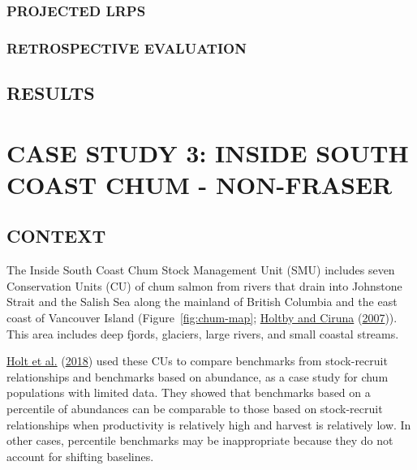 \documentclass[11pt]{book}
\begin{document}
\hypertarget{projected-lrps-1}{%
\subsubsection{PROJECTED LRPS}\label{projected-lrps-1}}

\hypertarget{retrospective-evaluation-1}{%
\subsubsection{RETROSPECTIVE EVALUATION}\label{retrospective-evaluation-1}}

\hypertarget{results-1}{%
\subsection{RESULTS}\label{results-1}}

\hypertarget{case-study-3-inside-south-coast-chum---non-fraser}{%
\section{CASE STUDY 3: INSIDE SOUTH COAST CHUM - NON-FRASER}\label{case-study-3-inside-south-coast-chum---non-fraser}}

\hypertarget{context-2}{%
\subsection{CONTEXT}\label{context-2}}

The Inside South Coast Chum Stock Management Unit (SMU) includes seven Conservation Units (CU) of chum salmon from rivers that drain into Johnstone Strait and the Salish Sea along the mainland of British Columbia and the east coast of Vancouver Island (Figure~\ref{fig:chum-map}; \protect\hyperlink{ref-holtby_conservation_2007}{Holtby and Ciruna} (\protect\hyperlink{ref-holtby_conservation_2007}{2007})). This area includes deep fjords, glaciers, large rivers, and small coastal streams.

\protect\hyperlink{ref-holt_evaluating_2018}{Holt et al.} (\protect\hyperlink{ref-holt_evaluating_2018}{2018}) used these CUs to compare benchmarks from stock-recruit relationships and benchmarks based on abundance, as a case study for chum populations with limited data. They showed that benchmarks based on a percentile of abundances can be comparable to those based on stock-recruit relationships when productivity is relatively high and harvest is relatively low. In other cases, percentile benchmarks may be inappropriate because they do not account for shifting baselines.
\end{document}
